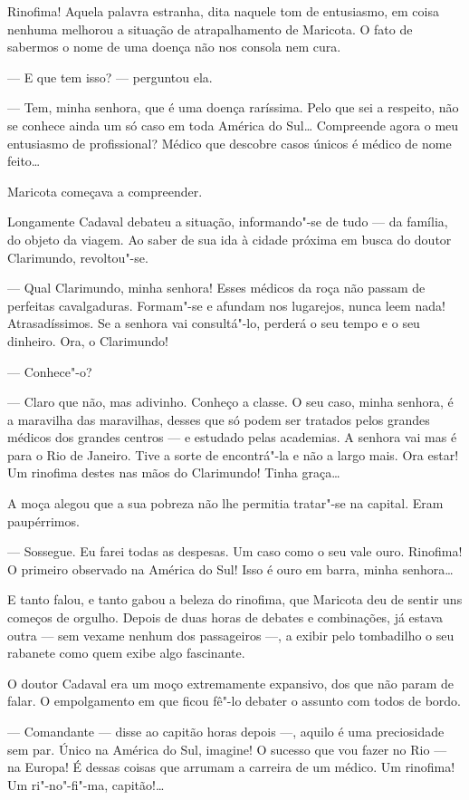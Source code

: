 Rinofima! Aquela palavra estranha, dita naquele tom de entusiasmo, em
coisa nenhuma melhorou a situação de atrapalhamento de Maricota. O fato
de sabermos o nome de uma doença não nos consola nem cura.

--- E que tem isso? --- perguntou ela.

--- Tem, minha senhora, que é uma doença raríssima. Pelo que sei a
respeito, não se conhece ainda um só caso em toda América do Sul\ldots{}
Compreende agora o meu entusiasmo de profissional? Médico que descobre
casos únicos é médico de nome feito\ldots{}

Maricota começava a compreender.

Longamente Cadaval debateu a situação, informando"-se de tudo --- da
família, do objeto da viagem. Ao saber de sua ida à cidade próxima em
busca do doutor Clarimundo, revoltou"-se.

--- Qual Clarimundo, minha senhora! Esses médicos da roça não passam de
perfeitas cavalgaduras. Formam"-se e afundam nos lugarejos, nunca leem
nada! Atrasadíssimos. Se a senhora vai consultá"-lo, perderá o seu tempo
e o seu dinheiro. Ora, o Clarimundo!

--- Conhece"-o?

--- Claro que não, mas adivinho. Conheço a classe. O seu caso, minha
senhora, é a maravilha das maravilhas, desses que só podem ser tratados
pelos grandes médicos dos grandes centros --- e estudado pelas
academias. A senhora vai mas é para o Rio de Janeiro. Tive a sorte de
encontrá"-la e não a largo mais. Ora estar! Um rinofima destes nas mãos
do Clarimundo! Tinha graça\ldots{}

A moça alegou que a sua pobreza não lhe permitia tratar"-se na capital.
Eram paupérrimos.

--- Sossegue. Eu farei todas as despesas. Um caso como o seu vale ouro.
Rinofima! O primeiro observado na América do Sul! Isso é ouro em barra,
minha senhora\ldots{}

E tanto falou, e tanto gabou a beleza do rinofima, que Maricota deu de
sentir uns começos de orgulho. Depois de duas horas de debates e
combinações, já estava outra --- sem vexame nenhum dos passageiros ---,
a exibir pelo tombadilho o seu rabanete como quem exibe algo fascinante.

O doutor Cadaval era um moço extremamente expansivo, dos que não param
de falar. O empolgamento em que ficou fê"-lo debater o assunto com todos
de bordo.

--- Comandante --- disse ao capitão horas depois ---, aquilo é uma
preciosidade sem par. Único na América do Sul, imagine! O sucesso que
vou fazer no Rio --- na Europa! É dessas coisas que arrumam a carreira
de um médico. Um rinofima! Um ri"-no"-fi"-ma, capitão!\ldots{}

